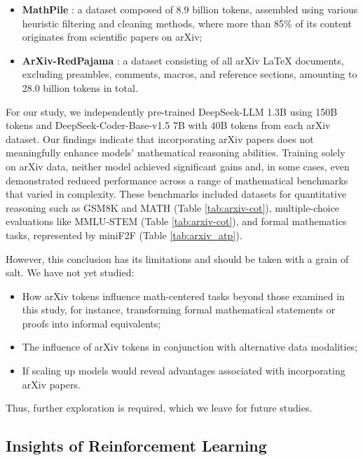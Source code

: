 \begin{itemize}[topsep=0pt]
\begin{itemize}[topsep=0pt]
\begin{itemize}[topsep=0pt]
    \item \textbf{MathPile} \citep{mathpile}: a dataset composed of 8.9 billion tokens, assembled using various heuristic filtering and cleaning methods, where more than 85\% of its content originates from scientific papers on arXiv;
    \item \textbf{ArXiv-RedPajama} \citep{redpajama}: a dataset consisting of all arXiv LaTeX documents, excluding preambles, comments, macros, and reference sections, amounting to 28.0 billion tokens in total.
\end{itemize}

For our study, we independently pre-trained DeepSeek-LLM 1.3B using 150B tokens and DeepSeek-Coder-Base-v1.5 7B with 40B tokens from each arXiv dataset. Our findings indicate that incorporating arXiv papers does not meaningfully enhance models’ mathematical reasoning abilities. Training solely on arXiv data, neither model achieved significant gains and, in some cases, even demonstrated reduced performance across a range of mathematical benchmarks that varied in complexity. These benchmarks included datasets for quantitative reasoning such as GSM8K and MATH (Table \ref{tab:arxiv-cot}), multiple-choice evaluations like MMLU-STEM (Table \ref{tab:arxiv-cot}), and formal mathematics tasks, represented by miniF2F (Table \ref{tab:arxiv_atp}).

However, this conclusion has its limitations and should be taken with a grain of salt. We have not yet studied:

\begin{itemize}[topsep=0pt]
    \item How arXiv tokens influence math-centered tasks beyond those examined in this study, for instance, transforming formal mathematical statements or proofs into informal equivalents;
    \item The influence of arXiv tokens in conjunction with alternative data modalities;
    \item If scaling up models would reveal advantages associated with incorporating arXiv papers.
\end{itemize}

Thus, further exploration is required, which we leave for future studies.

\subsection{Insights of Reinforcement Learning}

\end{itemize}
\end{itemize}

